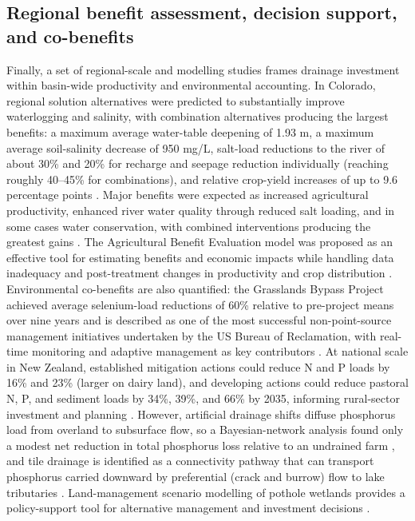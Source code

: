 \documentclass[11pt]{article}
\begin{document}
\subsection{Regional benefit assessment, decision support, and co-benefits}
Finally, a set of regional-scale and modelling studies frames drainage investment within basin-wide productivity and environmental accounting. In Colorado, regional solution alternatives were predicted to substantially improve waterlogging and salinity, with combination alternatives producing the largest benefits: a maximum average water-table deepening of 1.93 m, a maximum average soil-salinity decrease of 950 mg/L, salt-load reductions to the river of about 30\% and 20\% for recharge and seepage reduction individually (reaching roughly 40--45\% for combinations), and relative crop-yield increases of up to 9.6 percentage points \parencite{Burkhalter2006}. Major benefits were expected as increased agricultural productivity, enhanced river water quality through reduced salt loading, and in some cases water conservation, with combined interventions producing the greatest gains \parencite{Burkhalter2006}. The Agricultural Benefit Evaluation model was proposed as an effective tool for estimating benefits and economic impacts while handling data inadequacy and post-treatment changes in productivity and crop distribution \parencite{ROBINSON1992}. Environmental co-benefits are also quantified: the Grasslands Bypass Project achieved average selenium-load reductions of 60\% relative to pre-project means over nine years and is described as one of the most successful non-point-source management initiatives undertaken by the US Bureau of Reclamation, with real-time monitoring and adaptive management as key contributors \parencite{Quinn2009}. At national scale in New Zealand, established mitigation actions could reduce N and P loads by 16\% and 23\% (larger on dairy land), and developing actions could reduce pastoral N, P, and sediment loads by 34\%, 39\%, and 66\% by 2035, informing rural-sector investment and planning \parencite{McDowell2021}. However, artificial drainage shifts diffuse phosphorus load from overland to subsurface flow, so a Bayesian-network analysis found only a modest net reduction in total phosphorus loss relative to an undrained farm \parencite{Lucci2014}, and tile drainage is identified as a connectivity pathway that can transport phosphorus carried downward by preferential (crack and burrow) flow to lake tributaries \parencite{Allaire2011,Dadfar2010}. Land-management scenario modelling of pothole wetlands provides a policy-support tool for alternative management and investment decisions \parencite{Upadhyay2019}.
\end{document}
